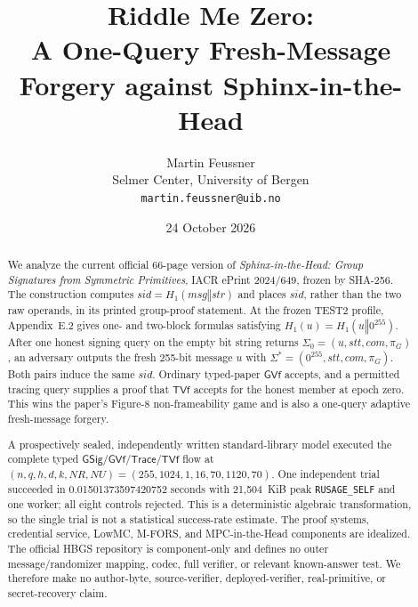 \documentclass[10pt,a4paper]{article}
\title{\bfseries Riddle Me Zero:\\
A One-Query Fresh-Message Forgery against Sphinx-in-the-Head}
\author{Martin Feussner\\
\small Selmer Center, University of Bergen\\
\small \texttt{martin.feussner@uib.no}}
\date{24 October 2026}
\newcommand{\Hone}{H_1}
\newcommand{\sid}{\mathit{sid}}
\newcommand{\strr}{\mathit{str}}
\newcommand{\stt}{\mathit{stt}}
\newcommand{\com}{\mathit{com}}
\newcommand{\msg}{\mathit{msg}}
\newcommand{\GVf}{\mathsf{GVf}}
\newcommand{\GSig}{\mathsf{GSig}}
\newcommand{\Trace}{\mathsf{Trace}}
\newcommand{\TVf}{\mathsf{TVf}}
\begin{document}
\maketitle

\noindent{}

\begin{abstract}
We analyze the current official 66-page version of
\emph{Sphinx-in-the-Head: Group Signatures from Symmetric Primitives}, IACR
ePrint 2024/649, frozen by SHA-256. The construction computes
$\sid=\Hone(\msg\mathbin\Vert\strr)$ and places $\sid$, rather than the two raw
operands, in its printed group-proof statement. At the frozen TEST2 profile,
Appendix~E.2 gives one- and two-block formulas satisfying
$\Hone(u)=\Hone(u\mathbin\Vert0^{255})$. After one honest signing query on the
empty bit string returns
$\Sigma_0=(u,\stt,\com,\pi_G)$, an adversary outputs the fresh 255-bit message
$u$ with $\Sigma^*=(0^{255},\stt,\com,\pi_G)$. Both pairs induce the same
$\sid$. Ordinary typed-paper $\GVf$ accepts, and a permitted tracing query
supplies a proof that $\TVf$ accepts for the honest member at epoch zero. This
wins the paper's Figure-8 non-frameability game and is also a one-query
adaptive fresh-message forgery.

A prospectively sealed, independently written standard-library model executed
the complete typed $\GSig/\GVf/\Trace/\TVf$ flow at
$(n,q,h,d,k,NR,NU)=(255,1024,1,16,70,1120,70)$. One independent trial
succeeded in 0.01501373597420752 seconds with 21,504~KiB peak
\texttt{RUSAGE\_SELF} and one worker; all eight controls rejected. This is a
deterministic algebraic transformation, so the single trial is not a
statistical success-rate estimate. The proof systems, credential service,
LowMC, M-FORS, and MPC-in-the-Head components are idealized. The official
HBGS repository is component-only and defines no outer message/randomizer
mapping, codec, full verifier, or relevant known-answer test. We therefore
make no author-byte, source-verifier, deployed-verifier, real-primitive, or
secret-recovery claim.
\end{abstract}
\end{document}
